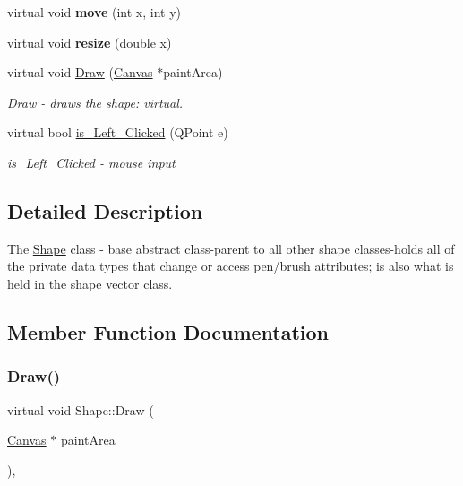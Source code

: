 \begin{DoxyCompactItemize}
virtual void {\bfseries move} (int x, int y)
\item 
\mbox{\label{class_shape_ab5523ae50b25161b3a64c7728de99e1f}} 
virtual void {\bfseries resize} (double x)
\item 
virtual void \hyperlink{class_shape_ad7cc6a5e97b0971d50999bce4396127a}{Draw} (\hyperlink{class_canvas}{Canvas} $\ast$paint\+Area)
\begin{DoxyCompactList}\small\item\em Draw -\/ draws the shape\+: virtual. \end{DoxyCompactList}\item 
virtual bool \hyperlink{class_shape_ab2d47c913eb287843e61b2d48e422ced}{is\+\_\+\+Left\+\_\+\+Clicked} (Q\+Point e)
\begin{DoxyCompactList}\small\item\em is\+\_\+\+Left\+\_\+\+Clicked -\/ mouse input \end{DoxyCompactList}\end{DoxyCompactItemize}


\subsection{Detailed Description}
The \hyperlink{class_shape}{Shape} class -\/ base abstract class-\/parent to all other shape classes-\/holds all of the private data types that change or access pen/brush attributes; is also what is held in the shape vector class. 

\subsection{Member Function Documentation}
\mbox{\label{class_shape_ad7cc6a5e97b0971d50999bce4396127a}} 
\subsubsection{\texorpdfstring{Draw()}{Draw()}}
{\footnotesize\ttfamily virtual void Shape\+::\+Draw (\begin{DoxyParamCaption}\item[{\hyperlink{class_canvas}{Canvas} $\ast$}]{paint\+Area }\end{DoxyParamCaption})\hspace{0.3cm}{\ttfamily [inline]}, {\ttfamily [virtual]}}



